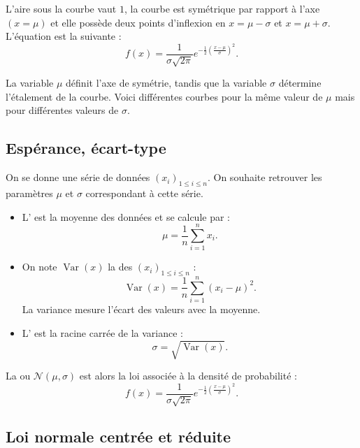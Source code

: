 \documentclass[11pt,class=report,crop=false]{standalone}
\begin{document}
L'aire sous la courbe vaut $1$, la courbe est symétrique par rapport à l'axe $(x=\mu)$ et elle possède deux points d'inflexion en $x=\mu-\sigma$ et $x=\mu+\sigma$.
L'équation est la suivante :
$$f(x) = \frac{1}{\sigma\sqrt{2\pi}} e^{-\frac12\left(\frac{x-\mu}{\sigma}\right)^2}.$$

La variable $\mu$ définit l'axe de symétrie, tandis que la variable $\sigma$ détermine l'étalement de la courbe. Voici différentes courbes pour la même valeur de $\mu$ mais pour différentes valeurs de $\sigma$.





\subsection{Espérance, écart-type}

On se donne une série de données $(x_i)_{1\le i \le n}$. On souhaite retrouver les paramètres
$\mu$ et $\sigma$ correspondant à cette série.


\begin{itemize}
  \item L' est la moyenne des données et se calcule par :
$$\mu = \frac{1}{n} \sum_{i=1}^n x_i.$$

  \item On note $\operatorname{Var}(x)$ la  des $(x_i)_{1\le i \le n}$ :  
	$$\operatorname{Var}(x) = \frac{1}{n} \sum_{i=1}^{n}(x_i-\mu)^2.$$
	La variance mesure l'écart des valeurs avec la moyenne.
		
  \item L' est la racine carrée de la variance :
  $$\sigma = \sqrt{\operatorname{Var}(x)}.$$
\end{itemize}

La  ou  $\mathcal{N}(\mu,\sigma)$ est alors la loi associée à la densité de probabilité :
$$f(x) = \frac{1}{\sigma\sqrt{2\pi}} e^{-\frac12\left(\frac{x-\mu}{\sigma}\right)^2}.$$


\subsection{Loi normale centrée et réduite}
\end{document}

